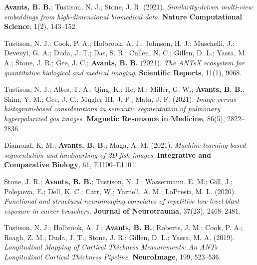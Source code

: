 \documentclass[10pt,letterpaper]{article}
\begin{document}
\begin{enumerate}
{  %
  \item \textbf{Avants, B. B.}; Tustison, N. J.; Stone, J. R. (2021). \textit{Similarity-driven multi-view embeddings from high-dimensional biomedical data}. \textbf{Nature Computational Science}, 1(2), 143--152.
  \item Tustison, N. J.; Cook, P. A.; Holbrook, A. J.; Johnson, H. J.; Muschelli, J.; Devenyi, G. A.; Duda, J. T.; Das, S. R.; Cullen, N. C.; Gillen, D. L.; Yassa, M. A.; Stone, J. R.; Gee, J. C.; \textbf{Avants, B. B.} (2021). \textit{The ANTsX ecosystem for quantitative biological and medical imaging}. \textbf{Scientific Reports}, 11(1), 9068.
  \item Tustison, N. J.; Altes, T. A.; Qing, K.; He, M.; Miller, G. W.; \textbf{Avants, B. B.}; Shim, Y. M.; Gee, J. C.; Mugler III, J. P.; Mata, J. F. (2021). \textit{Image-versus histogram-based considerations in semantic segmentation of pulmonary hyperpolarized gas images}. \textbf{Magnetic Resonance in Medicine}, 86(5), 2822--2836.
  \item Diamond, K. M.; \textbf{Avants, B. B.}; Maga, A. M. (2021). \textit{Machine learning-based segmentation and landmarking of 2D fish images}. \textbf{Integrative and Comparative Biology}, 61, E1100--E1101.

  \item Stone, J. R.; \textbf{Avants, B. B.}; Tustison, N. J.; Wassermann, E. M.; Gill, J.; Polejaeva, E.; Dell, K. C.; Carr, W.; Yarnell, A. M.; LoPresti, M. L. (2020). \textit{Functional and structural neuroimaging correlates of repetitive low-level blast exposure in career breachers}. \textbf{Journal of Neurotrauma}, 37(23), 2468--2481.
  \item Tustison, N. J.; Holbrook, A. J.; \textbf{Avants, B. B.}; Roberts, J. M.; Cook, P. A.; Reagh, Z. M.; Duda, J. T.; Stone, J. R.; Gillen, D. L.; Yassa, M. A. (2019). \textit{Longitudinal Mapping of Cortical Thickness Measurements: An ANTs Longitudinal Cortical Thickness Pipeline}. \textbf{NeuroImage}, 199, 523--536.

}
\end{enumerate}
\end{document}
